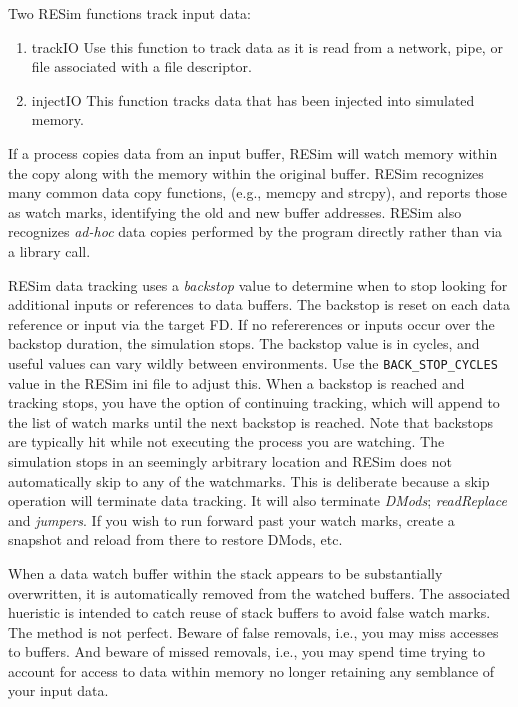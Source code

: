 \documentclass[titlepage]{article}
\begin{document}
Two RESim functions track input data:
\begin{enumerate}
\item {trackIO} Use this function to track data as it is read from a network, pipe, or file associated with a file descriptor.
\item {injectIO} This function tracks data that has been injected into simulated memory.
\end{enumerate}

If a process copies data from an input buffer, RESim will watch memory within the copy along with the memory within the original buffer.
RESim recognizes many common data copy functions, (e.g., memcpy and strcpy), and reports those as watch marks, identifying the old and new buffer addresses.
RESim also recognizes \textit{ad-hoc} data copies performed by the program directly rather than via a library call.

RESim data tracking uses a \textit{backstop} value to determine when to stop looking for additional inputs or references to data buffers.  The backstop is reset on each
data reference or input via the target FD.  If no refererences or inputs occur over the backstop duration, the simulation stops.  The backstop value is in 
cycles, and useful values can vary wildly between environments.  Use the {\tt BACK\_STOP\_CYCLES} value in the RESim ini file to adjust this.
When a backstop is reached and tracking stops, you have the option of continuing tracking, which will append to the list of watch marks until the next backstop is
reached. Note that backstops are typically hit while not executing the process you are watching.  The simulation stops in an seemingly arbitrary location and 
RESim does not automatically skip to any of the watchmarks.  This is deliberate because a skip operation will terminate data tracking.  It will also terminate
\textit{DMods}; \textit{readReplace} and \textit{jumpers}.  If you wish to run forward past your watch marks, create a snapshot and reload from there to restore DMods, etc.

When a data watch buffer within the stack appears to be substantially overwritten, it is automatically removed from the watched buffers.
The associated hueristic is intended to catch reuse of stack buffers to avoid false watch marks. The method is not perfect.  Beware of false removals, i.e., you
may miss accesses to buffers.  And beware of missed removals, i.e., you may spend time trying to account for access to data within memory
no longer retaining any semblance of your input data.
\end{document}
